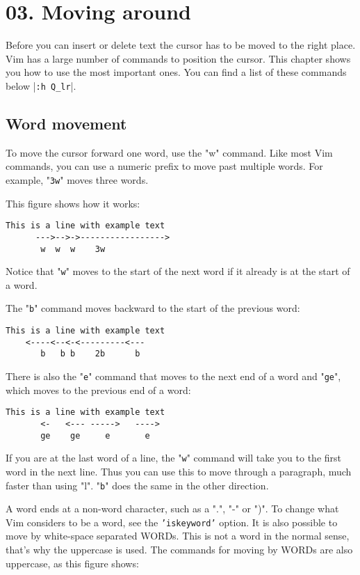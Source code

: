\section{03. Moving around}
Before you can insert or delete text the cursor has to be moved to the right
place.  Vim has a large number of commands to position the cursor.  This
chapter shows you how to use the most important ones.  You can find a list of
these commands below |\texttt{:h Q\_lr}|.
\subsection{Word movement}

To move the cursor forward one word, use the "w" command.
Like most Vim commands, you can use a numeric prefix to move past multiple words.
For example, "\texttt{3w}" moves three words.

This figure shows how it works:

		\begin{Verbatim}[samepage=true]
    This is a line with example text 
      --->-->->----------------->
       w  w  w    3w
		\end{Verbatim}

Notice that "\texttt{w}" moves to the start of the next word if it already is at the start of a word.

The "\texttt{b}" command moves backward to the start of the previous word:

		\begin{Verbatim}[samepage=true]
    This is a line with example text 
    <----<--<-<---------<---
       b   b b    2b      b
		\end{Verbatim}

There is also the "\texttt{e}" command that moves to the next end of a word and "\texttt{ge}", which moves to the previous end of a word:

		\begin{Verbatim}[samepage=true]
    This is a line with example text 
       <-   <--- ----->   ---->
       ge    ge     e       e
		\end{Verbatim}

If you are at the last word of a line, the "\texttt{w}" command will take you to the first word in the next line.
Thus you can use this to move through a paragraph, much faster than using "l".
"\texttt{b}" does the same in the other direction.

A word ends at a non-word character, such as a ".", "-" or ")".
To change what Vim considers to be a word, see the \texttt{'iskeyword'} option.
It is also possible to move by white-space separated WORDs.
This is not a word in the normal sense, that's why the uppercase is used.
The commands for moving by WORDs are also uppercase, as this figure shows:

